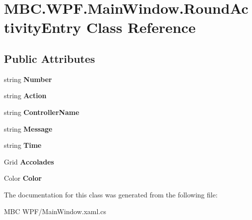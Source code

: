 \hypertarget{class_m_b_c_1_1_w_p_f_1_1_main_window_1_1_round_activity_entry}{\section{M\-B\-C.\-W\-P\-F.\-Main\-Window.\-Round\-Activity\-Entry Class Reference}
\label{class_m_b_c_1_1_w_p_f_1_1_main_window_1_1_round_activity_entry}
}
\subsection*{Public Attributes}
\begin{DoxyCompactItemize}
\item 
\hypertarget{class_m_b_c_1_1_w_p_f_1_1_main_window_1_1_round_activity_entry_af6e27c24a5e0791ed05c630bebc6e10b}{string {\bfseries Number}}\label{class_m_b_c_1_1_w_p_f_1_1_main_window_1_1_round_activity_entry_af6e27c24a5e0791ed05c630bebc6e10b}

\item 
\hypertarget{class_m_b_c_1_1_w_p_f_1_1_main_window_1_1_round_activity_entry_aea96424ed99783f4d568367eb0361d2f}{string {\bfseries Action}}\label{class_m_b_c_1_1_w_p_f_1_1_main_window_1_1_round_activity_entry_aea96424ed99783f4d568367eb0361d2f}

\item 
\hypertarget{class_m_b_c_1_1_w_p_f_1_1_main_window_1_1_round_activity_entry_abfd5d18a30b5b7ec5568c22cfff36212}{string {\bfseries Controller\-Name}}\label{class_m_b_c_1_1_w_p_f_1_1_main_window_1_1_round_activity_entry_abfd5d18a30b5b7ec5568c22cfff36212}

\item 
\hypertarget{class_m_b_c_1_1_w_p_f_1_1_main_window_1_1_round_activity_entry_aa1a2ec80f45be5d265e5c9d22ba0d7f7}{string {\bfseries Message}}\label{class_m_b_c_1_1_w_p_f_1_1_main_window_1_1_round_activity_entry_aa1a2ec80f45be5d265e5c9d22ba0d7f7}

\item 
\hypertarget{class_m_b_c_1_1_w_p_f_1_1_main_window_1_1_round_activity_entry_a883afba30eab544c6294067892404a43}{string {\bfseries Time}}\label{class_m_b_c_1_1_w_p_f_1_1_main_window_1_1_round_activity_entry_a883afba30eab544c6294067892404a43}

\item 
\hypertarget{class_m_b_c_1_1_w_p_f_1_1_main_window_1_1_round_activity_entry_a3c686ce94c9514d9c974a7e8898b2109}{Grid {\bfseries Accolades}}\label{class_m_b_c_1_1_w_p_f_1_1_main_window_1_1_round_activity_entry_a3c686ce94c9514d9c974a7e8898b2109}

\item 
\hypertarget{class_m_b_c_1_1_w_p_f_1_1_main_window_1_1_round_activity_entry_adf003a8df551703a86d33cf9f1558377}{Color {\bfseries Color}}\label{class_m_b_c_1_1_w_p_f_1_1_main_window_1_1_round_activity_entry_adf003a8df551703a86d33cf9f1558377}

\end{DoxyCompactItemize}


The documentation for this class was generated from the following file\-:\begin{DoxyCompactItemize}
\item 
M\-B\-C W\-P\-F/Main\-Window.\-xaml.\-cs\end{DoxyCompactItemize}
